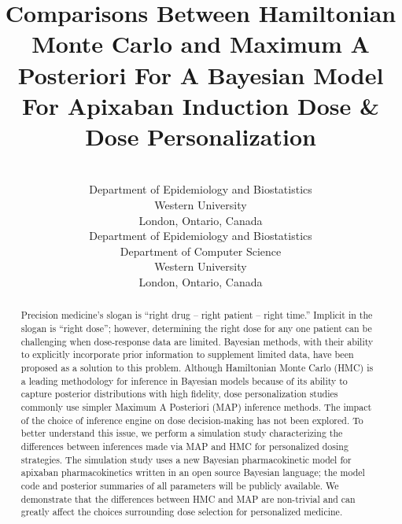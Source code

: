\documentclass[pmlr]{jmlr}%
\title[Comparisons Between HMC and MAP For Precision Medicine]{Comparisons Between Hamiltonian Monte Carlo and Maximum A Posteriori For A Bayesian Model For Apixaban Induction Dose \& Dose Personalization}
\author{\Name{A. Demetri Pananos}
       \Email{apananos@uwo.ca}\\ 
       \addr Department of Epidemiology and Biostatistics\\
       Western University\\
		London, Ontario, Canada
       \AND
       \Name{Daniel J. Lizotte}
       \Email{dlizotte@uwo.ca}\\ 
       \addr Department of Epidemiology and Biostatistics\\
       Department of Computer Science\\
       Western University\\
       London, Ontario, Canada}
\begin{document}
\maketitle

\begin{abstract}
Precision medicine’s slogan is “right drug -- right patient -- right time.” Implicit in the slogan is ``right dose''; however, determining the right dose for any one patient can be challenging when dose-response data are limited. Bayesian methods, with their ability to explicitly incorporate prior information to supplement limited data, have been proposed as a solution to this problem. Although Hamiltonian Monte Carlo (HMC) is a leading methodology for inference in Bayesian models because of its ability to capture posterior distributions with high fidelity, dose personalization studies commonly use simpler Maximum A Posteriori (MAP) inference methods. The impact of the choice of inference engine on dose decision-making has not been explored.   To better understand this issue, we perform a simulation study characterizing the differences between inferences made via MAP and HMC for personalized dosing strategies. The simulation study uses a new Bayesian pharmacokinetic model for apixaban pharmacokinetics written in an open source Bayesian language; the model code and posterior summaries of all parameters will be publicly available. We demonstrate that the differences between HMC and MAP are non-trivial and can greatly affect the choices surrounding dose selection for personalized medicine.

\end{abstract}







\end{document}
